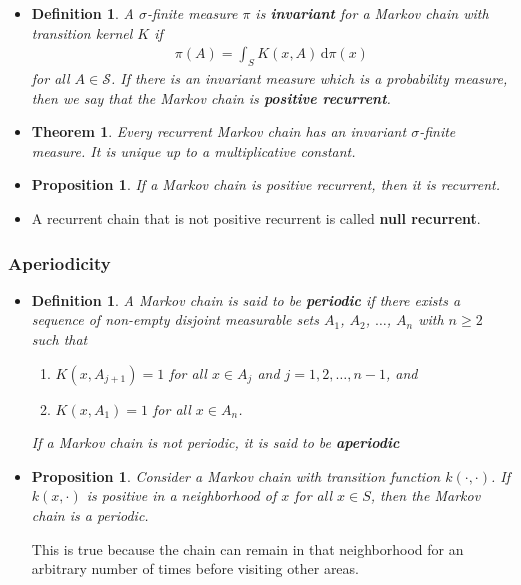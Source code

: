 \documentclass[10pt]{article}
\newtheorem{theorem}[lemma]{Theorem}
\newtheorem{definition}[lemma]{Definition}
\newtheorem{proposition}[lemma]{Proposition}
\newcommand{\dee}{\mathrm{d}}
\newcommand{\mcal}[1]{\mathcal{#1}}
\begin{document}
\begin{itemize}
  \item \begin{definition}
    A $\sigma$-finite measure $\pi$ is {\bf invariant} for a Markov chain with transition kernel $K$ if
    \begin{align*}
      \pi(A) = \int_S K(x,A)\, \dee\pi(x)
    \end{align*}
    for all $A \in \mcal{S}$. If there is an invariant measure which is a probability measure, then we say that the Markov chain is {\bf positive recurrent}.
  \end{definition}

  \item \begin{theorem}
    Every recurrent Markov chain has an invariant $\sigma$-finite measure. It is unique up to a multiplicative constant.
  \end{theorem}

  \item \begin{proposition}
    If a Markov chain is positive recurrent, then it is recurrent.
  \end{proposition}

  \item A recurrent chain that is not positive recurrent is called {\bf null recurrent}.
\end{itemize}
  
\subsubsection{Aperiodicity}

\begin{itemize}
  \item \begin{definition}
    A Markov chain is said to be {\bf periodic} if there exists a sequence of non-empty disjoint measurable sets $A_1$, $A_2$, $\dotsc$, $A_n$ with $n \geq 2$ such that
    \begin{enumerate}
      \item[(a)] $K(x, A_{j+1}) = 1$ for all $x \in A_j$ and $j = 1, 2, \dotsc, n-1$, and
      \item[(b)] $K(x, A_1) = 1$ for all $x \in A_n$.
    \end{enumerate}
    If a Markov chain is not periodic, it is said to be {\bf aperiodic}
  \end{definition}

  \item \begin{proposition}
    Consider a Markov chain with transition function $k(\cdot, \cdot)$. If $k(x, \cdot)$ is positive in a neighborhood of $x$ for all $x \in S$, then the Markov chain is a periodic.
  \end{proposition}

  This is true because the chain can remain in that neighborhood for an arbitrary number of times before visiting other areas.
\end{itemize}
\end{document}
